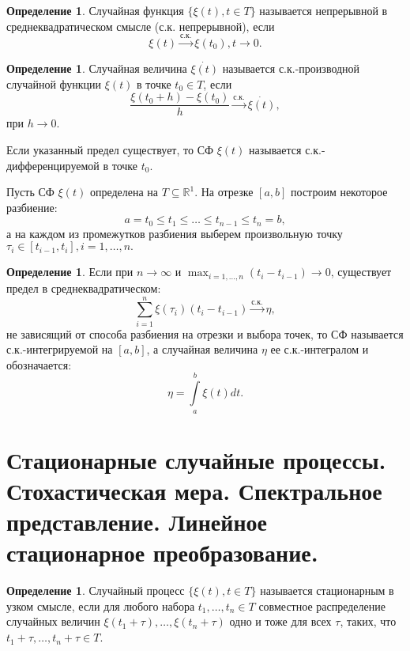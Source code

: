 \documentclass[12pt]{report}
\theoremstyle{definition}
\newtheorem{definition}[theorem]{Определение}
\newcommand{\R}{\mathbb R}
\begin{document}
\begin{definition}
Случайная функция $\{ \xi(t), t \in T \}$ называется непрерывной
в среднеквадратическом смысле (с.к. непрерывной), если
$$
\xi(t) \xrightarrow{\text{с.к.}} \xi(t_0), t \rightarrow 0.
$$
\end{definition}

\begin{definition}
Случайная величина $\dot{\xi(t)}$ называется с.к.-производной
случайной функции $\xi(t)$ в точке $t_0 \in T$, если
$$
\dfrac{\xi(t_0 + h) - \xi(t_0)}{h} \xrightarrow{\text{с.к.}} \dot{\xi(t)},
$$
при $h \rightarrow 0$.
\end{definition}

Если указанный предел существует, то СФ $\xi(t)$ называется
с.к.-дифференцируемой в точке $t_0$.

Пусть СФ $\xi(t)$ определена на $T \subseteq \R^1$.
На отрезке $[a, b]$ построим некоторое разбиение:
$$
a = t_0 \le t_1 \le \dots \le t_{n-1} \le t_n = b,
$$
а на каждом из промежутков разбиения выберем произвольную точку
$\tau_i \in [t_{i-1}, t_i], i = 1, \dots, n.$

\begin{definition}
Если при $n \rightarrow \infty$ и $\max_{i = 1, \dots, n} (t_i - t_{i-1}) \rightarrow 0$,
существует предел в среднеквадратическом:
$$
\sum\limits_{i = 1}^n \xi(\tau_i) (t_i - t_{i-1}) \xrightarrow{\text{с.к.}} \eta,
$$
не зависящий от способа разбиения на отрезки и выбора точек, то СФ называется
с.к.-интегрируемой на $[a, b]$, а случайная величина $\eta$ ее с.к.-интегралом
и обозначается:
$$
\eta = \int\limits_{a}^{b} \xi(t) dt.
$$
\end{definition}



\section
{
  Стационарные случайные процессы. Стохастическая мера.
  Спектральное представление. Линейное стационарное преобразование.
}

\begin{definition}
Случайный процесс $\{\xi(t), t \in T\}$ называется стационарным в узком смысле,
если для любого набора $t_1, \dots, t_n \in T$ совместное распределение случайных
величин $\xi(t_1 + \tau), \dots, \xi(t_n + \tau)$ одно и тоже для всех $\tau$,
таких, что $t_1 + \tau, \dots, t_n + \tau \in T$.
\end{definition}
\end{document}
